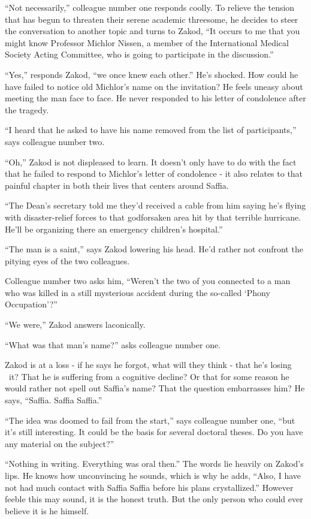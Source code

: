 \documentclass[twoside,11pt]{book}
\begin{document}
``Not necessarily,'' colleague number one responds coolly. To relieve the tension that has
begun to threaten their serene academic threesome, he decides to steer the conversation to another topic and turns to
Zakod, ``It occurs to me that you might know Professor Michlor Nissen, a member of the International
Medical Society Acting Committee, who is going to participate in the discussion.''

``Yes,'' responds Zakod, ``we once knew each other.'' He's shocked.
How could he have failed to notice old Michlor's name on the invitation?  He feels uneasy about meeting the man face
to face. He never responded to his letter of condolence after the tragedy.

``I heard that he asked to have his name removed from the list of participants,'' says
colleague number two.

``Oh,'' Zakod is not displeased to learn. It doesn't only have to do with the fact that he
failed to respond to Michlor's letter of condolence - it also relates to that painful chapter in both their lives that
centers around Saffia.

``The Dean's secretary told me they'd received a cable from him saying he's flying with disaster-relief
forces to that godforsaken area hit by that terrible hurricane. He'll be organizing there an
emergency children's hospital.''

``The man is a saint,'' says Zakod lowering his head. He'd rather not confront the pitying eyes
of the two colleagues.

Colleague number two asks him, ``Weren't the two of you connected to a man who was killed in a still
mysterious accident during the so-called `Phony Occupation'?''

``We were,'' Zakod answers laconically.

``What was that man's name?'' asks colleague number one.

Zakod is at a loss - if he says he forgot, what will they think - that he's losing
\ it? That he is suffering from a cognitive decline? Or that for some reason he would
rather not spell out Saffia's name? That the question embarrasses him? He says, ``Saffia. Saffia
Saffia.''

``The idea was doomed to fail from the start,'' says colleague number one, ``but it's still
interesting. It could be the basis for several doctoral theses. Do you have any material on the
subject?''

``Nothing in writing. Everything was oral then.'' The words lie heavily on Zakod's lips. He
knows how unconvincing he sounds, which is why he adds, ``Also, I have not had much contact with Saffia
Saffia before his plans crystallized.'' However feeble this may sound, it is the honest truth. But the
only person who could ever believe it is he himself.
\end{document}
